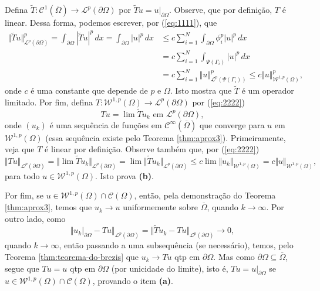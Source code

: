 \documentclass[a4paper, 11pt]{book}
\theoremstyle{definition}
\newcommand{\cC}{\mathcal{C}}
\newcommand{\cL}{\mathcal{L}}
\newcommand{\cW}{\mathcal{W}}
\begin{document}
\begin{prf}
    Defina $\widetilde T : \cC^1(\overline \Omega) \to \cL^p(\partial\Omega)$ por $\widetilde T u = u |_{\partial \Omega}$.
    Observe, que por definição, $T$ é linear.
    Dessa forma, podemos escrever, por (\ref{eq:1111}), que
    \begin{equation} \label{eq:2222}
        \begin{aligned}
            \Vert \widetilde Tu \Vert_{\cL^p(\partial \Omega)}^p = \int_{\partial\Omega} | \widetilde T u|^p \,dx = \int_{\partial\Omega} |u|^p \,dx &\leqslant c \sum_{i=1}^{N} \int_{\partial \Omega} \phi_i^p |u|^p \,dx\\ 
            &= c \sum_{i=1}^N \int_{\Psi(\Gamma_i)} |u|^p \,dx\\ 
            &= c\sum_{i=1}^N \Vert u \Vert_{\cL^p(\Psi(\Gamma_i))}^p \leqslant c\Vert u \Vert_{\cW^{1,p}(\Omega)}^p,
        \end{aligned}
    \end{equation}
    onde $c$ é uma constante que depende de $p$ e $\Omega$. Isto mostra que $\widetilde T$ é um operador limitado.
    Por fim, defina $T : \cW^{1,p}(\Omega) \to \cL^p(\partial \Omega)$ por (\ref{eq:2222})
    \[
        T u = \lim \widetilde T u_k \text{ em } \cL^p(\partial \Omega),
    \]
    onde $(u_k)$ é uma sequência de funções em $\cC^{\infty}(\overline\Omega)$ que converge para $u$ em $\cW^{1,p}(\Omega)$ (essa sequência existe pelo Teorema \ref{thm:aprox3}). 
    Primeiramente, veja que $T$ é linear por definição.
    Observe também que, por (\ref{eq:2222})
    \[
        \Vert Tu \Vert_{\cL^p(\partial \Omega)} = \Vert \lim \widetilde T u_k \Vert_{\cL^p(\partial \Omega)} = \lim \Vert \widetilde T u_k \Vert_{\cL^p(\partial \Omega)} \leqslant c \lim \Vert u_k \Vert_{\cW^{1,p}(\Omega)} = c \Vert u \Vert_{\cW^{1,p}(\Omega)},
    \]
    para todo $u \in \cW^{1,p}(\Omega)$. Isto prova \textbf{(b)}.

    Por fim, se $u \in \cW^{1,p}(\Omega) \cap \cC(\Omega)$, então, pela demonstração do Teorema \ref{thm:aprox3}, temos que $u_k \to u$ uniformemente sobre $\overline\Omega$, quando $k \to \infty$.
    Por outro lado, como
    \[
        \Vert u_k |_{\partial\Omega} - Tu \Vert_{\cL^p(\partial \Omega)} = \Vert \widetilde T u_k - Tu \Vert_{\cL^p(\partial\Omega)} \to 0,
    \]
    quando $k \to \infty$, então passando a uma subsequência (se necessário), temos, pelo Teorema \ref{thm:teorema-do-brezis} que $u_k \to Tu$ qtp em $\partial \Omega$.
    Mas como $\partial \Omega \subseteq \overline\Omega$, segue que $Tu = u$ qtp em $\partial \Omega$ (por unicidade do limite), isto é, $Tu = u|_{\partial\Omega}$ se $u \in \cW^{1,p}(\Omega) \cap \cC(\Omega)$, provando o item \textbf{(a)}.
\end{prf}
\end{document}
